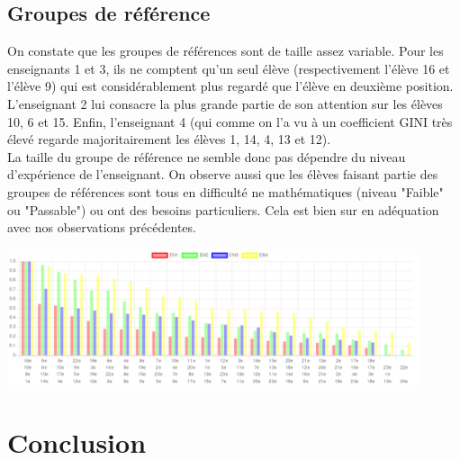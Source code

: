 \documentclass{article}
\begin{document}
\subsection{Groupes de référence}
On constate que les groupes de références sont de taille assez variable. Pour les enseignants 1 et 3, ils ne comptent qu'un seul élève (respectivement l'élève 16 et l'élève 9) qui est considérablement plus regardé que l'élève en deuxième position. L'enseignant 2 lui consacre la plus grande partie de son attention sur les élèves 10, 6 et 15. Enfin, l'enseignant 4 (qui comme on l'a vu à un coefficient GINI très élevé regarde majoritairement les élèves 1, 14, 4, 13 et 12).\\
La taille du groupe de référence ne semble donc pas dépendre du niveau d'expérience de l'enseignant. On observe aussi que les élèves faisant partie des groupes de références sont tous en difficulté ne mathématiques (niveau "Faible" ou "Passable") ou ont des besoins particuliers. Cela est bien sur en adéquation avec nos observations précédentes.
\begin{center}
    \includegraphics[height=4cm]{ordre_decroissant.png}
\end{center}

\section{Conclusion}

{}

\end{document}

